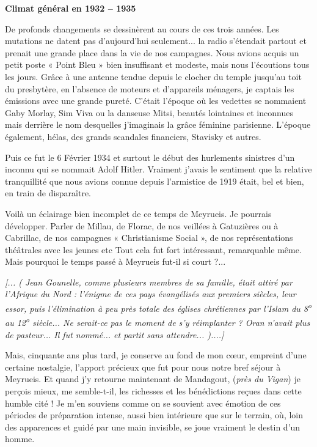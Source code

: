 
\textbf{Climat général en 1932 -- 1935}

De profonds changements se dessinèrent au cours de ces trois années. Les mutations
ne datent pas d’aujourd’hui seulement... la radio s’étendait partout et prenait une
grande place dans la vie de nos campagnes. Nous avions acquis un petit poste « Point
Bleu » bien insuffisant et modeste, mais nous l’écoutions tous les jours. Grâce à une
antenne tendue depuis le clocher du temple jusqu’au toit du presbytère, en l’absence
de moteurs et d’appareils ménagers, je captais les émissions avec une grande pureté.
C’était l’époque où les vedettes se nommaient Gaby Morlay, Sim Viva ou la
danseuse Mitsi, beautés lointaines et inconnues mais derrière le nom desquelles
j’imaginais la grâce féminine parisienne. L’époque également, hélas, des grands
scandales financiers, Stavisky et autres.

Puis ce fut le 6 Février 1934 et surtout le début des hurlements sinistres d’un inconnu
qui se nommait Adolf Hitler. Vraiment j’avais le sentiment que la relative tranquillité
que nous avions connue depuis l’armistice de 1919 était, bel et bien, en train de
disparaître.

Voilà un éclairage bien incomplet de ce temps de Meyrueis. Je pourrais développer.
Parler de Millau, de Florac, de nos veillées à Gatuzières ou à Cabrillac, de nos
campagnes « Christianisme Social », de nos représentations théâtrales avec les jeunes
etc Tout cela fut fort intéressant, remarquable même. Mais pourquoi le temps passé à
Meyrueis fut-il si court ?...

\emph{[... ( Jean Gounelle, comme plusieurs membres de sa famille, était attiré par l’Afrique du Nord :
l’énigme de ces pays évangélisés aux premiers siècles, leur essor, puis l’élimination à peu près totale
des églises chrétiennes par l’Islam du 8\textsuperscript{o} au 12\textsuperscript{o} siècle... Ne serait-ce pas le moment de s’y
réimplanter ? Oran n’avait plus de pasteur... Il fut nommé... et partit sans attendre... )....]}

Mais, cinquante ans plus tard, je conserve au fond de mon cœur, empreint d’une
certaine nostalgie, l’apport précieux que fut pour nous notre bref séjour à Meyrueis.
Et quand j’y retourne maintenant de Mandagout, (\emph{près du Vigan}) je perçois mieux, me
semble-t-il, les richesses et les bénédictions reçues dans cette humble cité ! Je m’en
souviens comme on se souvient avec émotion de ces périodes de préparation intense,
aussi bien intérieure que sur le terrain, où, loin des apparences et guidé par une main
invisible, se joue vraiment le destin d’un homme.
